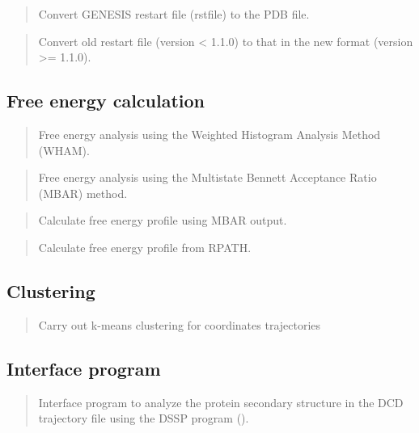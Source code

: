 \documentclass[a4paper,11pt,oneside,english]{sphinxmanual}
\begin{document}
\begin{quote}

Convert GENESIS restart file (rstfile) to the PDB file.
\end{quote}

\begin{quote}

Convert old restart file (version \textless{} 1.1.0) to that in the new format (version \textgreater{}= 1.1.0).
\end{quote}


\subsection{Free energy calculation}
\label{\detokenize{02_Available_Programs:free-energy-calculation}}
\begin{quote}

Free energy analysis using the Weighted Histogram Analysis Method (WHAM).
\end{quote}

\begin{quote}

Free energy analysis using the Multistate Bennett Acceptance Ratio (MBAR) method.
\end{quote}

\begin{quote}

Calculate free energy profile using MBAR output.
\end{quote}

\begin{quote}

Calculate free energy profile from RPATH.
\end{quote}


\subsection{Clustering}
\label{\detokenize{02_Available_Programs:clustering}}
\begin{quote}

Carry out k-means clustering for coordinates trajectories
\end{quote}


\subsection{Interface program}
\label{\detokenize{02_Available_Programs:interface-program}}
\begin{quote}

Interface program to analyze the protein secondary structure
in the DCD trajectory file
using the DSSP program ().
\end{quote}
\end{document}
